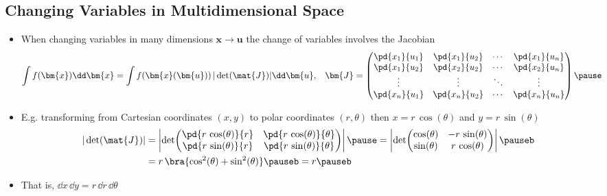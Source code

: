\begin{slide}
  \section[-2]{Changing Variables in Multidimensional Space}

\begin{PauseHighLight}
  \begin{itemize}
  \item When changing variables in many dimensions $\bm{x} \rightarrow
    \bm{u}$ the change of variables involves the Jacobian
    {\small
    \begin{align*}
      \int f(\bm{x}) \dd \bm{x}
      &= \int f(\bm{x}(\bm{u})) \, |\det(\mat{J})| \dd \bm{u},
        & \bm{J} &=
          \begin{pmatrix}
            \pd{x_1}{u_1} & \pd{x_1}{u_2} & \cdots & \pd{x_1}{u_n} \\
            \pd{x_1}{u_2} & \pd{x_2}{u_2} & \cdots & \pd{x_2}{u_n} \\
            \vdots & \vdots & \ddots & \vdots  \\
            \pd{x_n}{u_1} & \pd{x_n}{u_2} & \cdots & \pd{x_n}{u_n}
          \end{pmatrix}\pause
    \end{align*}}
  \item E.g. transforming from Cartesian coordinates $(x,y)$ to polar
    coordinates $(r,\theta)$ then $x=r\,\cos(\theta)$ and
    $y=r\,\sin(\theta)$
    {\small
    \begin{align*}
      |\det(\mat{J})| &= \left| \det\!\begin{pmatrix}
            \pd{r\,\cos(\theta)}{r} &  \pd{r\,\cos(\theta)}{\theta}  \\
            \pd{r\,\sin(\theta)}{r} &  \pd{r\,\sin(\theta)}{\theta}  \\
          \end{pmatrix} \right| \pause
    = \left| \det\!\begin{pmatrix}
            \cos(\theta) &  -r\,\sin(\theta)  \\
            \sin(\theta) &  r\,\cos(\theta)  \\
                   \end{pmatrix} \right| \pauseb\\
      &= r\,\bra{\cos^2(\theta) + \sin^2(\theta)}\pauseb = r \pauseb
    \end{align*}}
\item  That is, $\dd x\, \dd y = r\,\dd r\, \dd \theta$\pauseb
  \end{itemize}
\end{PauseHighLight}

\end{slide}

